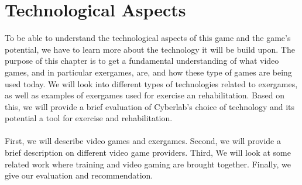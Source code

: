 \chapter{Technological Aspects}
To be able to understand the technological aspects of this game and the game's potential, we have to learn more about the technology it will be build upon.  The purpose of this chapter is to get a fundamental understanding of what video games, and in particular exergames, are, and how these type of games are being used today. We will look into different types of technologies related to exergames, as well as examples of exergames used for exercise an rehabilitation. Based on this, we will provide a brief evaluation of Cyberlab's choice of technology and its potential a tool for exercise and rehabilitation.  \\ \\ 
First, we will describe video games and exergames. Second, we will provide a brief description on different video game providers. Third, We will look at some related work where training and video gaming are brought together. Finally, we give our evaluation and recommendation.\\ \\

